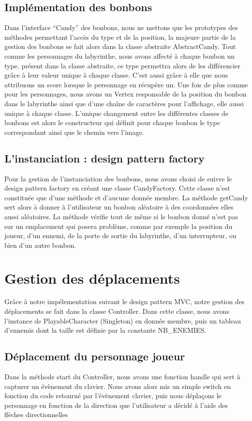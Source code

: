 \documentclass [10pt, a4paper]{article}
\begin{document}
\subsection {Implémentation des bonbons}
Dans l'interface ``Candy'' des bonbons, nous ne mettons que les prototypes des méthodes permettant l'accès du type et de la position, la majeure partie de la gestion des bonbons se fait alors dans la classe abstraite AbstractCandy. Tout comme les personnages du labyrinthe, nous avons affecté à chaque bonbon un type, présent dans la classe abstraite, ce type permettra alors de les différencier grâce à leur valeur unique à chaque classe. C'est aussi grâce à elle que nous attribuons un score lorsque le personnage en récupère un. Une fois de plus comme pour les personnages, nous avons un Vertex responsable de la position du bonbon dans le labyrinthe ainsi que d'une chaîne de caractères pour l'affichage, elle aussi unique à chaque classe. L'unique changement entre les différentes classes de bonbons est alors le constructeur qui définit pour chaque bonbon le type correspondant ainsi que le chemin vers l'image.

\subsection {L'instanciation : design pattern factory}
Pour la gestion de l'instanciation des bonbons, nous avons choisi de suivre le design pattern factory en créant une classe CandyFactory. Cette classe n'est constituée que d'une méthode et d'aucune donnée membre. La méthode getCandy sert alors à donner à l'utilisateur un bonbon aléatoire à des coordonnées elles aussi aléatoires. La méthode vérifie tout de même si le bonbon donné n'est pas sur un emplacement qui posera problème, comme par exemple la position du joueur, d'un ennemi, de la porte de sortie du labyrinthe, d'un interrupteur, ou bien d'un autre bonbon.



\section {Gestion des déplacements}
Grâce à notre impélementation suivant le design pattern MVC, notre gestion des déplacements se fait dans la classe Controller. Dans cette classe, nous avons l'instance de PlayableCharacter (Singleton) en donnée membre, puis un tableau d'ennemis dont la taille est définie par la constante NB\_ENEMIES.

\subsection {Déplacement du personnage joueur}
Dans la méthode start du Controller, nous avons une fonction handle qui sert à capturer un évènement du clavier. Nous avons alors mis un simple switch en fonction du code retourné par l'évènement clavier, puis nous déplaçons le personnage en fonction de la direction que l'utilisateur a décidé à l'aide des flèches directionnelles
\end{document}
